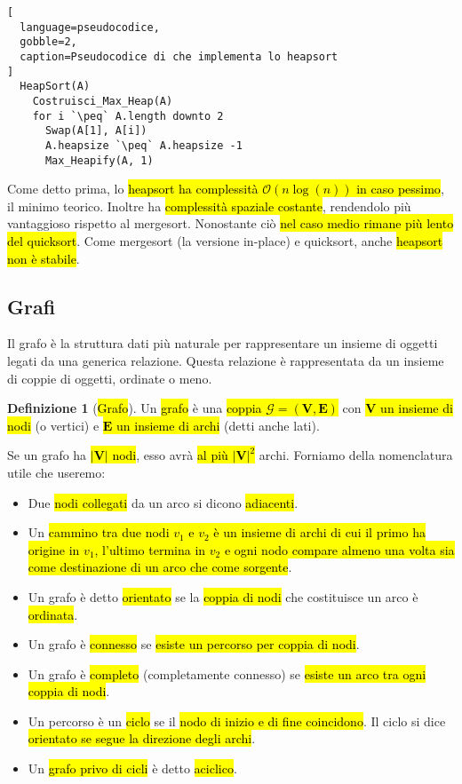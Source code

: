 \documentclass[a4paper,11pt,twoside]{article}
\theoremstyle{plain}
\theoremstyle{definition}
\newtheorem{defn}{Definizione}[section]
\theoremstyle{remark}
\newcommand{\peq}{$\gets$}
\begin{document}
\begin{lstlisting}[
  language=pseudocodice,
  gobble=2,
  caption=Pseudocodice di che implementa lo heapsort
]
  HeapSort(A)
    Costruisci_Max_Heap(A)
    for i `\peq` A.length downto 2
      Swap(A[1], A[i])
      A.heapsize `\peq` A.heapsize -1
      Max_Heapify(A, 1)
\end{lstlisting}

\noindent Come detto prima, lo \hl{heapsort ha complessità
$\mathcal{O}(n\log(n))$ in caso pessimo}, il minimo teorico. Inoltre ha
\hl{complessità spaziale costante}, rendendolo più vantaggioso rispetto al
mergesort. Nonostante ciò \hl{nel caso medio rimane più lento del quicksort}.
Come mergesort (la versione in-place) e quicksort, anche \hl{heapsort non è
stabile}.

\subsection{Grafi}\label{sec:graphs}

Il grafo è la struttura dati più naturale per rappresentare un insieme di
oggetti legati da una generica relazione. Questa relazione è rappresentata da un
insieme di coppie di oggetti, ordinate o meno.

\begin{defn}[\hl{Grafo}]\label{def:graph}
  Un \hl{grafo} è una \hl{coppia $\mathcal{G} = (\mathbf{V}, \mathbf{E})$} con
  \hl{$\mathbf{V}$ un insieme di nodi} (o vertici) e \hl{$\mathbf{E}$ un insieme
  di archi} (detti anche lati).
\end{defn}

Se un grafo ha \hl{$|\mathbf{V}|$ nodi}, esso avrà \hl{al più
${|\mathbf{V}|}^2$} archi. Forniamo della nomenclatura utile che useremo:

\begin{itemize}
  \item Due \hl{nodi collegati} da un arco si dicono \hl{adiacenti}.
  \item Un \hl{cammino tra due nodi $v_1$ e $v_2$ è un insieme di archi di cui
    il primo ha origine in $v_1$, l'ultimo termina in $v_2$ e ogni nodo compare
    almeno una volta sia come destinazione di un arco che come sorgente}.
  \item Un grafo è detto \hl{orientato} se la \hl{coppia di nodi} che
    costituisce un arco è \hl{ordinata}.
  \item Un grafo è \hl{connesso} se \hl{esiste un percorso per coppia di nodi}.
  \item Un grafo è \hl{completo} (completamente connesso) se \hl{esiste un arco
    tra ogni coppia di nodi}.
  \item Un percorso è un \hl{ciclo} se il \hl{nodo di inizio e di fine
    coincidono}. Il ciclo si dice \hl{orientato se segue la direzione degli
    archi}.
  \item Un \hl{grafo privo di cicli} è detto \hl{aciclico}.
\end{itemize}
\end{document}
